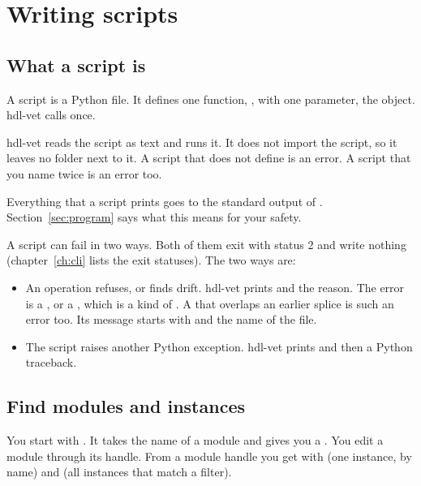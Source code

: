 \chapter{Writing scripts}
\label{ch:scripts}

\section{What a script is}

A script is a Python file. It defines one function, , with one
parameter, the  object. hdl-vet calls  once.



hdl-vet reads the script as text and runs it. It does not import the script, so it
leaves no  folder next to it. A script that does not define
 is an error. A script that you name twice is an error too.

Everything that a script prints goes to the standard output of .
Section~\ref{sec:program} says what this means for your safety.

A script can fail in two ways. Both of them exit with status 2 and write nothing
(chapter~\ref{ch:cli} lists the exit statuses). The two ways are:

\begin{itemize}
\item An operation refuses, or finds drift. hdl-vet prints  and the
  reason. The error is a , or a , which is a kind of
  . A  that overlaps an earlier splice is such an error
  too. Its message starts with  and the name of the file.
\item The script raises another Python exception. hdl-vet prints
   and then a Python traceback.
\end{itemize}

\section{Find modules and instances}

You start with . It takes the name of a module and gives you a
. You edit a module through its handle. From a module handle
you get  with  (one instance, by name)
and  (all instances that match a filter).

